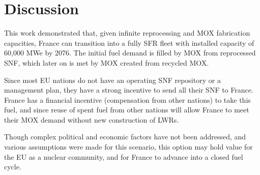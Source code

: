 \section{Discussion}
This work demonstrated that, given infinite
reprocessing and \gls{MOX} fabrication capacities,
France can transition into a fully \gls{SFR} fleet
with installed capacity of 60,000 MWe by 2076.
The initial fuel demand is filled by \gls{MOX} from
reprocessed \gls{SNF}, which later on
is met by \gls{MOX} created from recycled \gls{MOX}.

Since most \gls{EU} nations do not have an operating \gls{SNF}
repository or a management plan, they have a strong incentive
to send all their \gls{SNF} to France. France has a financial
incentive (compensation from other nations) to take this fuel,
and since reuse of spent fuel from
other nations will allow France to meet their MOX demand
without new construction of \glspl{LWR}.

Though complex political and economic factors have not been
addressed, and various assumptions were made for this scenario,
this option may hold value for the \gls{EU} as a nuclear community,
and for France to advance into a closed fuel cycle.
